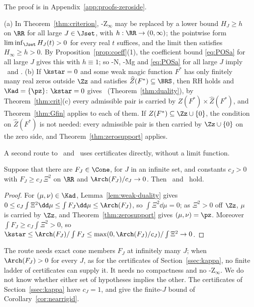 The proof is in Appendix~\ref{app:proofs-zeroside}.

\begin{remark}[Variants]\label{rem:variant}
(a) In Theorem~\ref{thm:criterion}, \hyp{Z$_\infty$} may be replaced by a lower bound $H_J\ge h$ on $\RR$ for all large $J\in\Jset$, with
$h:\RR\to(0,\infty)$; the pointwise form $\liminf_{\Jset}H_J(t)>0$ for every real $t$ suffices, and the limit then satisfies $H_\infty\ge h>0$.
By Proposition~\ref{prop:coeff}(1), the coefficient bound \eqref{eq:POSa} for all large $J$ gives this with $h\equiv1$; so \hyp{N}, \hyp{Mg}
and \eqref{eq:POSa} for all large $J$ imply \condS\ and \condU.
(b) If $\kstar=0$ and some weak magic function $F^*$ has only finitely many real zeros outside $\Zz$ and satisfies $\widehat Z(F^*)\subseteq\BRS$, then
RH holds and $\Kad=\{\pz\}$: $\kstar=0$ gives \condE\ (Theorem~\ref{thm:duality}), by Theorem~\ref{thm:crit}(c) every admissible pair is
carried by $Z(F^*)\times\widehat Z(F^*)$, and Theorem~\ref{thm:Gfin} applies to each of them. If $Z(F^*)\subseteq\Zz\cup\{0\}$, the condition
on $\widehat Z(F^*)$ is not needed: every admissible pair is then carried by $\Zz\cup\{0\}$ on the zero side, and
Theorem~\ref{thm:zerosupport} applies.
\end{remark}

A second route to \condU\ and \condS\ uses certificates directly, without a limit function.

\begin{corollary}\label{cor:certroute}
Suppose that there are $F_J\in\Cone$, for $J$ in an infinite set, and constants $c_J>0$ with $F_J\ge c_J\,\Xi^2$ on $\RR$ and
$\Arch(F_J)/c_J\to0$. Then \condU\ and \condS\ hold.\astranote
\end{corollary}

\begin{proof}
For $(\mu,\nu)\in\Kad$, Lemma~\ref{lem:weak-duality} gives $0\le c_J\int\Xi^2\dd\mu\le\int F_J\dd\mu\le\Arch(F_J)$, so $\int\Xi^2\dd\mu=0$; as
$\Xi^2>0$ off $\Zz$, $\mu$ is carried by $\Zz$, and Theorem~\ref{thm:zerosupport} gives $(\mu,\nu)=\pz$. Moreover $\int F_J\ge c_J\int\Xi^2>0$, so
$\kstar\le\Arch(F_J)/\int F_J\le\max(0,\Arch(F_J)/c_J)/\int\Xi^2\to0$.
\end{proof}

The route needs exact cone members $F_J$ at infinitely many $J$; when $\Arch(F_J)>0$ for every $J$, as for the certificates of
Section~\ref{ssec:kappa}, no finite ladder of certificates can supply it. It needs no compactness and no \hyp{Z$_\infty$}. We do not know
whether either set of hypotheses implies the other. The certificates of Section~\ref{ssec:kappa} have
$c_J=1$, and give the finite-$J$ bound of Corollary~\ref{cor:nearrigid}.
